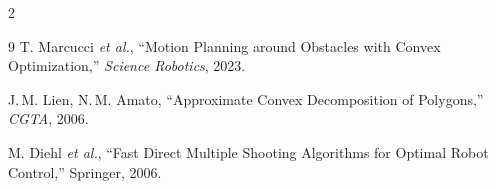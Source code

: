 \documentclass[final]{beamer}
\begin{document}
\begin{frame}[t]
\begin{multicols}{2}
\begin{thebibliography}{9}
\footnotesize
{}
T. Marcucci \emph{et al.}, ``Motion Planning around Obstacles with Convex Optimization,'' \emph{Science Robotics}, 2023.

J.\,M. Lien, N.\,M. Amato, ``Approximate Convex Decomposition of Polygons,'' \emph{CGTA}, 2006.

M. Diehl \emph{et al.}, ``Fast Direct Multiple Shooting Algorithms for Optimal Robot Control,'' Springer, 2006.
\end{thebibliography}


\end{multicols}

\end{frame}
\end{document}
